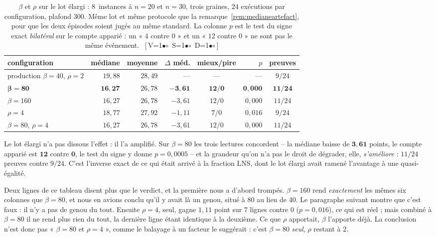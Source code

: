\documentclass[11pt,a4paper]{article}
\theoremstyle{plain}
\theoremstyle{remark}
\newcommand{\cfgm}[1]{\ifnum#1=1$\bullet$\else$\circ$\fi}
\newcommand{\conf}[3]{%
  \textsf{\footnotesize[\,V\cfgm{#1}\ S\cfgm{#2}\ D\cfgm{#3}\,]}}
\begin{document}
\begin{table}[H]
\centering
\caption{$\beta$ et $\rho$ sur le lot élargi : $8$~instances à $n=20$ et
$n=30$, trois graines, $24$ exécutions par configuration, plafond $300$.
Même lot et même protocole que la remarque~\ref{rem:medianeartefact}, pour
que les deux épisodes soient jugés au même standard. La colonne $p$ est le
test du signe exact \emph{bilatéral} sur le compte apparié : un
« $4$ contre $0$ » et un « $12$ contre $0$ » ne sont pas le même
événement.\ \conf{1}{1}{1}}
\label{tab:confirmbeta}
\setlength{\tabcolsep}{5pt}\small
\begin{tabular}{lrrrcrc}
\toprule
configuration & médiane & moyenne & $\Delta$ méd. & mieux/pire & $p$ & preuves\\
\midrule
production $\beta=40$, $\rho=2$ & $19{,}88$ & $28{,}49$ & --- & --- & --- & $9/24$\\
$\mathbf{\beta=80}$ & $\mathbf{16{,}27}$ & $26{,}78$ & $\mathbf{-3{,}61}$ & $\mathbf{12/0}$ & $\mathbf{0{,}000}$ & $\mathbf{11/24}$\\
$\beta=160$ & $16{,}27$ & $26{,}78$ & $-3{,}61$ & $12/0$ & $0{,}000$ & $11/24$\\
$\rho=4$ & $18{,}77$ & $27{,}92$ & $-1{,}11$ & $7/0$ & $0{,}016$ & $9/24$\\
$\beta=80$, $\rho=4$ & $16{,}27$ & $26{,}78$ & $-3{,}61$ & $12/0$ & $0{,}000$ & $11/24$\\
\bottomrule
\end{tabular}
\end{table}

\noindent
Le lot élargi n'a pas dissous l'effet : il l'a amplifié. Sur $\beta=80$ les
trois lectures concordent -- la médiane baisse de $\mathbf{3{,}61}$ points,
le compte apparié est $\mathbf{12}$ contre $\mathbf{0}$, le test du signe y
donne $p=0{,}0005$ -- et la grandeur qu'on n'a pas le droit de dégrader,
elle, \emph{s'améliore} : $11/24$ preuves contre $9/24$. C'est l'inverse
exact de ce qui était arrivé à la fraction LNS, dont le lot élargi avait
ramené l'avantage à une quasi-égalité.

Deux lignes de ce tableau disent plus que le verdict, et la première nous a
d'abord trompés. $\beta=160$ rend \emph{exactement} les mêmes six colonnes
que $\beta=80$, et nous en avions conclu qu'il y avait là un genou, situé à
$80$ au lieu de $40$. Le paragraphe suivant montre que c'est faux : il n'y a
pas de genou du tout. Ensuite $\rho=4$, seul, gagne $1{,}11$ point
sur $7$ lignes contre $0$ ($p=0{,}016$), ce qui est réel ; mais combiné à
$\beta=80$ il ne rend plus rien du tout, la dernière ligne étant identique à
la deuxième. Ce que $\rho$ apportait, $\beta$ l'apporte déjà. La conclusion
n'est donc pas « $\beta=80$ et $\rho=4$ », comme le balayage à un facteur le
suggérait : c'est $\beta=80$ \emph{seul}, $\rho$ restant à $2$.
\end{document}
